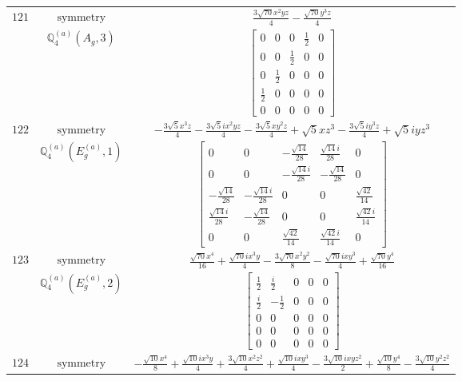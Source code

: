 \documentclass[fleqn,8pt,landscape]{jsarticle}
\begin{document}
\begin{longtable}{ccc}
$ 121 $ & $ \text{symmetry} $ & $ \frac{3 \sqrt{70} x^{2} y z}{4} - \frac{\sqrt{70} y^{3} z}{4} $ \\
$  $ & $ \mathbb{Q}_{4}^{(a)}(A_{g},3) $ & $ \begin{bmatrix} 0 & 0 & 0 & \frac{1}{2} & 0 \\ 0 & 0 & \frac{1}{2} & 0 & 0 \\ 0 & \frac{1}{2} & 0 & 0 & 0 \\ \frac{1}{2} & 0 & 0 & 0 & 0 \\ 0 & 0 & 0 & 0 & 0 \end{bmatrix} $ \\ \hline
$ 122 $ & $ \text{symmetry} $ & $ - \frac{3 \sqrt{5} x^{3} z}{4} - \frac{3 \sqrt{5} i x^{2} y z}{4} - \frac{3 \sqrt{5} x y^{2} z}{4} + \sqrt{5} x z^{3} - \frac{3 \sqrt{5} i y^{3} z}{4} + \sqrt{5} i y z^{3} $ \\
$  $ & $ \mathbb{Q}_{4}^{(a)}(E_{g}^{(a)},1) $ & $ \begin{bmatrix} 0 & 0 & - \frac{\sqrt{14}}{28} & \frac{\sqrt{14} i}{28} & 0 \\ 0 & 0 & - \frac{\sqrt{14} i}{28} & - \frac{\sqrt{14}}{28} & 0 \\ - \frac{\sqrt{14}}{28} & - \frac{\sqrt{14} i}{28} & 0 & 0 & \frac{\sqrt{42}}{14} \\ \frac{\sqrt{14} i}{28} & - \frac{\sqrt{14}}{28} & 0 & 0 & \frac{\sqrt{42} i}{14} \\ 0 & 0 & \frac{\sqrt{42}}{14} & \frac{\sqrt{42} i}{14} & 0 \end{bmatrix} $ \\ \hline
$ 123 $ & $ \text{symmetry} $ & $ \frac{\sqrt{70} x^{4}}{16} + \frac{\sqrt{70} i x^{3} y}{4} - \frac{3 \sqrt{70} x^{2} y^{2}}{8} - \frac{\sqrt{70} i x y^{3}}{4} + \frac{\sqrt{70} y^{4}}{16} $ \\
$  $ & $ \mathbb{Q}_{4}^{(a)}(E_{g}^{(a)},2) $ & $ \begin{bmatrix} \frac{1}{2} & \frac{i}{2} & 0 & 0 & 0 \\ \frac{i}{2} & - \frac{1}{2} & 0 & 0 & 0 \\ 0 & 0 & 0 & 0 & 0 \\ 0 & 0 & 0 & 0 & 0 \\ 0 & 0 & 0 & 0 & 0 \end{bmatrix} $ \\ \hline
$ 124 $ & $ \text{symmetry} $ & $ - \frac{\sqrt{10} x^{4}}{8} + \frac{\sqrt{10} i x^{3} y}{4} + \frac{3 \sqrt{10} x^{2} z^{2}}{4} + \frac{\sqrt{10} i x y^{3}}{4} - \frac{3 \sqrt{10} i x y z^{2}}{2} + \frac{\sqrt{10} y^{4}}{8} - \frac{3 \sqrt{10} y^{2} z^{2}}{4} $ \\

\end{longtable}
\end{document}
